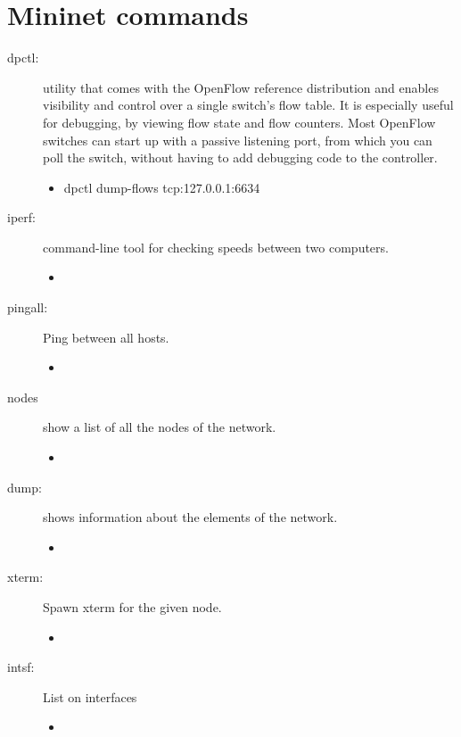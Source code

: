 \chapter{Mininet commands}


\begin{description}
\item[dpctl:]  utility that comes with the OpenFlow reference distribution and enables visibility and control over a single switch's flow table. It is especially useful for debugging, by viewing flow state and flow counters. Most OpenFlow switches can start up with a passive listening port, from which you can poll the switch, without having to add debugging code to the controller.
	\begin{itemize}
	\item dpctl dump-flows tcp:127.0.0.1:6634
	\end{itemize}
\item[iperf:] command-line tool for checking speeds between two computers.
	\begin{itemize}
	\item 
	\end{itemize}
\item[pingall:] Ping between all hosts.
	\begin{itemize}
	\item 
	\end{itemize}
\item[nodes] show a list of all the nodes of the network.
	\begin{itemize}
	\item 
	\end{itemize}
\item[dump:] shows information about the elements of the network. 
	\begin{itemize}
	\item 
	\end{itemize}
\item[xterm:] Spawn xterm for the given node.
	\begin{itemize}
	\item 
	\end{itemize}
\item[intsf:] List on interfaces 
	\begin{itemize}
	\item 
	\end{itemize}	
\end{description}

